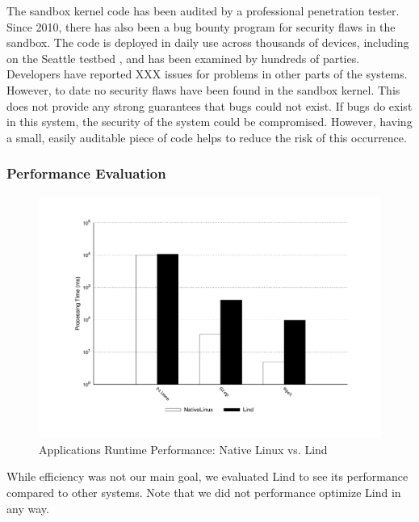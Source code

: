 The sandbox kernel code has been 
audited by a professional penetration tester.  Since 2010, there has also been
a bug bounty program for security flaws in the sandbox. 
The code is deployed in daily use across thousands of devices, 
including on the Seattle testbed \cite{seattle}, and has been examined by 
hundreds of parties.  Developers have reported
XXX issues for problems in other parts of the systems. However, to date
no security flaws have been found in the sandbox kernel.
This does not provide any strong guarantees that bugs could not exist.  If bugs do
exist in this system, the security of the system could be compromised.  
However, having a small, easily auditable piece of code helps to reduce the
risk of this occurrence.

\subsubsection{Performance Evaluation}
\label{Performance-Evaluation}

\begin{figure}
\centering
\includegraphics[width=1.0\columnwidth]{diagram/lind_oakland16_performance.pdf}
\caption{Applications Runtime Performance: Native Linux vs. Lind}
\label{fig:performance_applications}
\end{figure}

While efficiency was not our main goal, we evaluated Lind to see 
its performance compared to other systems.  Note that we did not performance
optimize Lind in any way.

